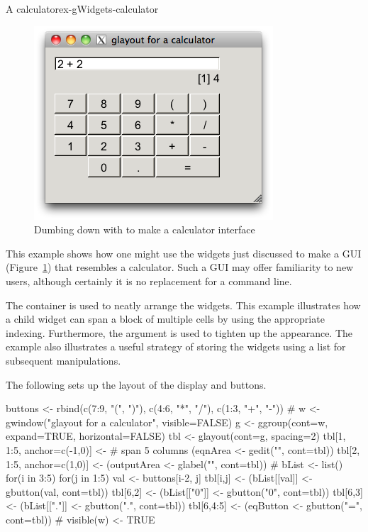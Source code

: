 \begin{example}{A calculator}{ex-gWidgets-calculator}

\begin{figure}
  \centering
  \includegraphics[width=.6\textwidth]{fig-gWidgets-calculuator.png}
  \caption{Dumbing down \R{} with  to make a calculator interface}
  \label{fig:gwidgets-calculator}
\end{figure}

This example shows how one might use the widgets just discussed to
make a GUI (Figure~\ref{fig:gwidgets-calculator}) that resembles a
calculator. Such a GUI may offer familiarity to new \R\/ users,
although certainly it is no replacement for a command line.

The  container is used to neatly arrange the
widgets. This example illustrates how a child widget can span a block
of multiple cells by using the appropriate indexing. Furthermore, the
 argument is used to tighten up the appearance. The
example also illustrates a useful strategy of storing the widgets
using a list for subsequent manipulations.

The following sets up the layout of the display and buttons.
\begin{Schunk}
\begin{Sinput}
 buttons <- rbind(c(7:9, "(", ")"),
                  c(4:6, "*", "/"),
                  c(1:3, "+", "-"))
 #
 w <- gwindow("glayout for a calculator", visible=FALSE)
 g <- ggroup(cont=w, expand=TRUE, horizontal=FALSE)
 tbl <- glayout(cont=g, spacing=2)
 tbl[1, 1:5, anchor=c(-1,0)] <-          # span 5 columns
   (eqnArea <- gedit("", cont=tbl))
 tbl[2, 1:5, anchor=c(1,0)] <- 
   (outputArea <- glabel("", cont=tbl))
 #
 bList <- list()
 for(i in 3:5) {
   for(j in 1:5) {
     val <- buttons[i-2, j]
     tbl[i,j] <- (bList[[val]] <- gbutton(val, cont=tbl))
   }
 }
 tbl[6,2] <- (bList[["0"]] <- gbutton("0", cont=tbl))
 tbl[6,3] <- (bList[["."]] <- gbutton(".", cont=tbl))
 tbl[6,4:5] <- (eqButton <- gbutton("=", cont=tbl))
 #
 visible(w) <- TRUE
\end{Sinput}
\end{Schunk}


\end{example}
